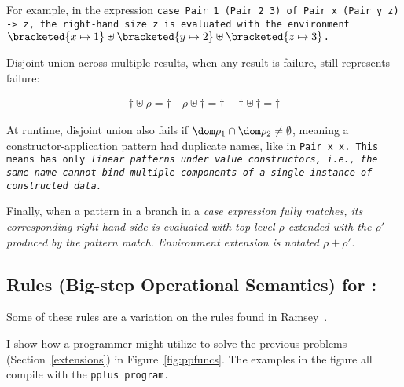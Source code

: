 \documentclass[manuscript,screen,review, 12pt, nonacm]{acmart}
\begin{document}
For example, in the \PPlus expression \tt{case Pair 1 (Pair 2 3) of Pair x (Pair
y z) -> z}, the right-hand size \tt{z} is evaluated with the environment
$\bracketed{x \mapsto 1} \uplus \bracketed{y \mapsto 2} \uplus \bracketed{z
\mapsto 3}$. 

Disjoint union across multiple results, when any result is failure, still
represents failure: 

\begin{gather*}
  \dagger \uplus \rho = \dagger \quad
  \rho \uplus \dagger = \dagger \quad
  \dagger \uplus\, \dagger = \dagger
\end{gather*}


At runtime, disjoint union also fails if  $\dom \rho_{1} \cap \dom \rho_{2} \neq
\emptyset$, meaning a constructor-application pattern had duplicate names, like
in \tt{Pair x x}. This means \PPlus has only \it{linear} patterns under value
constructors, i.e., the same name cannot bind multiple components of a single
instance of constructed data. 

Finally, when a pattern in a branch in a \it{case} expression fully matches, its
corresponding right-hand side is evaluated with top-level $\rho$ extended with
the $\rho'$ produced by the pattern match. Environment extension is notated
$\rho + \rho'$. 

    \subsection{Rules (Big-step Operational Semantics) for \PPlus:}
    \label{ppsemantics}
    
    Some of these rules are a variation on the rules found in Ramsey~\cite{bpc}.   
    
      \ppsemantics 
      
      \bigskip 
    
    I show how a programmer might utilize \PPlus to solve the previous problems
    (Section~\ref{extensions}) in Figure~\ref{fig:ppfuncs}. The examples in the
    figure all compile with the \tt{pplus} program. 
\end{document}
